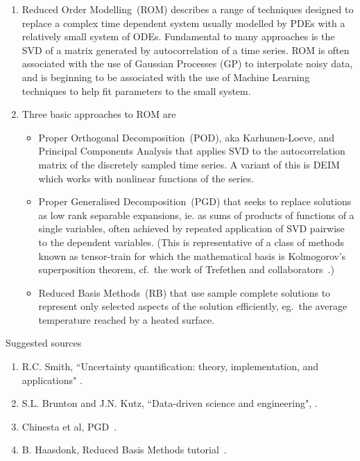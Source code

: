 \begin{enumerate}
\item Reduced Order Modelling~(ROM) describes a range of techniques
designed to replace a complex time dependent system usually modelled by PDEs
with a relatively small system of ODEs. Fundamental to many approaches
is the SVD of a matrix generated by autocorrelation of a time series.
ROM is often associated with the use of Gaussian Processes (GP)
to interpolate noisy data, and is beginning to be associated
with the use of Machine Learning techniques to help fit
parameters to the small system.
\item Three basic approaches to ROM are
\begin{itemize}
\item Proper Orthogonal Decomposition~(POD), aka Karhunen-Loeve,
and Principal Components Analysis
that applies SVD to the autocorrelation matrix of the discretely
sampled time series. A variant of this is DEIM which works with
nonlinear functions of the series.
\item Proper Generalised Decomposition~(PGD)
that seeks to replace solutions as low rank separable expansions,
ie. as sums of products of functions
of a single variables, often achieved by repeated application of SVD pairwise
to the dependent variables. (This is representative of a class of methods
known as tensor-train for which the mathematical basis is Kolmogorov's superposition
theorem, cf.\ the work of Trefethen and collaborators~\cite{To15Cont}.)
\item Reduced Basis Methods~(RB) that use sample complete solutions
to represent only selected aspects of the solution efficiently,
eg.\ the average temperature reached by a heated surface.
\end{itemize}
\end{enumerate}

Suggested sources
\begin{enumerate}
\item R.C. Smith, ``Uncertainty quantification: theory, implementation, and applications" \cite{smithUQ}.
\item S.L. Brunton and J.N. Kutz, ``Data-driven science and engineering", \cite[\S\,IV]{bruntonkutz}.
\item Chinesta et al, PGD~\cite{chinestaetal}.
\item B. Haasdonk, Reduced Basis Methods tutorial~\cite{Ha17Redu}.
\end{enumerate}

